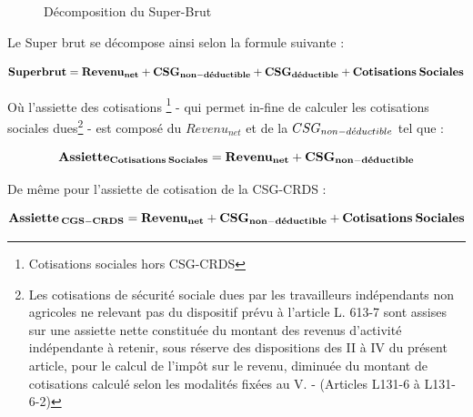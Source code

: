 \vspace{0.2cm}

\begin{figure}[!h]
    \center
    \caption{Décomposition du Super-Brut}
\end{figure}

\newpage

Le Super brut se décompose ainsi selon la formule suivante : 

\vspace{0.2cm}

\begin{equation}
\mathbf{
Superbrut = Revenu_{net} + CSG_{non-d\Acute{e}ductible} + CSG_{d\Acute{e}ductible} + Cotisations \: Sociales \label{equa_prp}
}
\end{equation}

\vspace{0.5cm}

Où l'assiette des cotisations \footnote{Cotisations sociales hors CSG-CRDS} - qui permet in-fine de calculer les cotisations sociales dues\footnote{Les cotisations de sécurité sociale dues par les travailleurs indépendants non agricoles ne relevant pas du dispositif prévu à l'article L. 613-7
sont assises sur une assiette nette constituée du montant des revenus d'activité indépendante à retenir, sous réserve des dispositions des II à IV du présent article, pour le calcul de l'impôt sur le revenu, diminuée du montant de cotisations calculé selon les modalités fixées au V. - (Articles L131-6 à L131-6-2)} - est composé du \(Revenu_{net}\) et de la \(CSG_{non-d\Acute{e}ductible}\) tel que : 

\vspace{0.2cm}

\begin{equation}
\mathbf{
Assiette_{Cotisations \: Sociales} = Revenu_{net} + CSG_{non-d\Acute{e}ductible} 
}
\end{equation}

\vspace{0.5cm}

De même pour l'assiette de cotisation de la CSG-CRDS : 

\vspace{0.2cm}

\begin{equation}\label{eq:test}
\mathbf{
Assiette_{\: CGS-CRDS} = Revenu_{net} + CSG_{non-d\Acute{e}ductible} + Cotisations \: Sociales
}
\end{equation}

